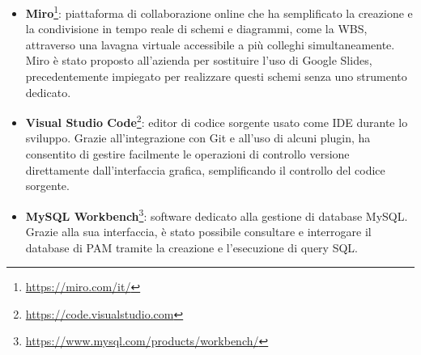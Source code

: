 \begin{itemize}
    \item \textbf{Miro}\footnote{\url{https://miro.com/it/}}: piattaforma di collaborazione online che ha semplificato la creazione e la condivisione in tempo reale di schemi e diagrammi, come la \ac{WBS},
    attraverso una lavagna virtuale accessibile a più colleghi simultaneamente. Miro è stato proposto all'azienda per sostituire l’uso di Google Slides, precedentemente impiegato
    per realizzare questi schemi senza uno strumento dedicato.
    \item \textbf{Visual Studio Code}\footnote{\url{https://code.visualstudio.com}}: editor di codice sorgente usato come IDE durante lo sviluppo. Grazie all'integrazione con Git e all'uso di alcuni plugin, ha consentito
    di gestire facilmente le operazioni di controllo versione direttamente dall’interfaccia grafica, semplificando il controllo del codice sorgente.
    \item \textbf{MySQL Workbench}\footnote{\url{https://www.mysql.com/products/workbench/}}: software dedicato alla gestione di database MySQL. Grazie alla sua interfaccia, è stato possibile consultare e interrogare il database di \ac{PAM}
    tramite la creazione e l’esecuzione di query SQL.
\end{itemize}

